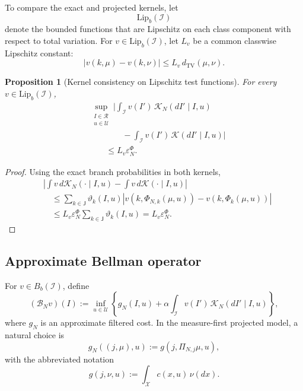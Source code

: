 \documentclass[10pt,twocolumn]{article}
\newtheorem{proposition}{Proposition}
\theoremstyle{remark}
\newcommand{\Ucal}{\mathcal{U}}
\newcommand{\Xcal}{\mathcal{X}}
\newcommand{\Ical}{\mathcal{I}}
\begin{document}
To compare the exact and projected kernels, let
\[
\mathrm{Lip}_b(\Ical)
\]
denote the bounded functions that are Lipschitz on each class component with respect to total variation. For \(v\in\mathrm{Lip}_b(\Ical)\), let \(L_v\) be a common classwise Lipschitz constant:
\begin{equation*}
	|v(k,\mu)-v(k,\nu)|
	\leq
	L_v\,d_{\mathrm{TV}}(\mu,\nu).
	\label{eq:value-classwise-lipschitz}
\end{equation*}

\begin{proposition}[Kernel consistency on Lipschitz test functions]
	\label{prop:approximate-kernel-consistency}
	For every \(v\in\mathrm{Lip}_b(\Ical)\),
	\begin{equation*}
		\begin{aligned}
			&\sup_{\substack{I\in\mathcal R\\ u\in\Ucal}}
			\Bigg|
			\int_{\mathcal I}
			v(I')\,\mathcal K_N(dI'\mid I,u)
			\\
			&\qquad\qquad
			-
			\int_{\mathcal I}
			v(I')\,\mathcal K(dI'\mid I,u)
			\Bigg|
			\\
			&\qquad\leq
			L_v\varepsilon_N^{\Phi}.
		\end{aligned}
		\label{eq:kernel-consistency-bound}
	\end{equation*}
\end{proposition}

\begin{proof}
	Using the exact branch probabilities in both kernels,
	\[
	\begin{aligned}
		&\left|
		\int v\,d\mathcal K_N(\cdot\mid I,u)
		-
		\int v\,d\mathcal K(\cdot\mid I,u)
		\right|
		\\
		&\quad\leq
		\sum_{k\in\mathsf J}
		\vartheta_k(I,u)
		\left|
		v(k,\Phi_{N,k}(\mu,u))
		-
		v(k,\Phi_k(\mu,u))
		\right|
		\\
		&\quad\leq
		L_v\varepsilon_N^{\Phi}
		\sum_{k\in\mathsf J}\vartheta_k(I,u)
		=
		L_v\varepsilon_N^{\Phi}.
	\end{aligned}
	\]
\end{proof}

\subsection{Approximate Bellman operator}
\label{subsec:approximate-bellman-operator}

For \(v\in B_b(\Ical)\), define
\begin{equation}
	(\mathcal B_Nv)(I)
	:=
	\inf_{u\in\Ucal}
	\left\{
	g_N(I,u)
	+
	\alpha
	\int_{\Ical}
	v(I')\,\mathcal K_N(dI'\mid I,u)
	\right\},
	\label{eq:approximate-bellman-operator}
\end{equation}
where \(g_N\) is an approximate filtered cost. In the measure-first projected model, a natural choice is
\begin{equation}
	g_N((j,\mu),u)
	:=
	g\!\left(
	j,\Pi_{N,j}\mu,u
	\right),
	\label{eq:projected-stage-cost}
\end{equation}
with the abbreviated notation
\[
g(j,\nu,u)
:=
\int_{\Xcal}c(x,u)\,\nu(dx).
\]
\end{document}
